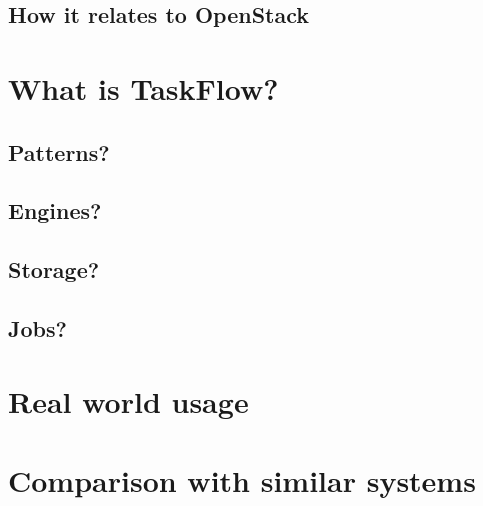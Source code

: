 \documentclass[11pt,a4paper]{article}
\begin{document}
\subsection{How it relates to OpenStack}

\section{What is TaskFlow?}

\subsection{Patterns?}

\subsection{Engines?}

\subsection{Storage?}

\subsection{Jobs?}

\section{Real world usage}

\section{Comparison with similar systems}
\end{document}
